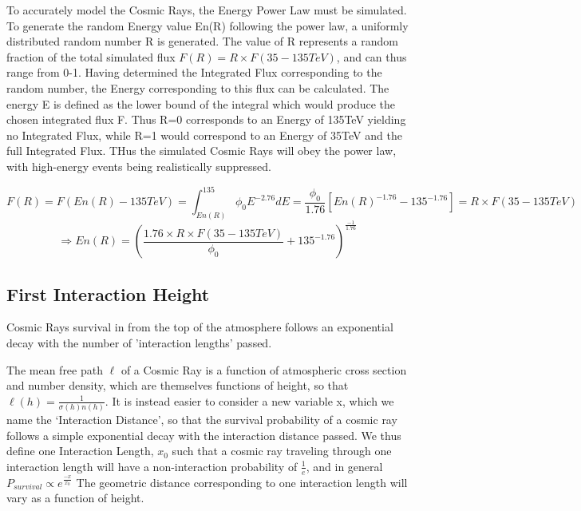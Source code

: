 \documentclass{article}
\begin{document}
To accurately model the Cosmic Rays, the Energy Power Law must be simulated. To generate the random Energy value En(R) following the power law, a uniformly distributed random number R is generated. The value of R represents a random fraction of the total simulated flux $ F(R) = R \times F(35-135TeV) $, and can thus range from 0-1. Having determined the Integrated Flux corresponding to the random number, the Energy corresponding to this flux can be calculated. The energy E is defined as the lower bound of the integral which would produce the chosen integrated flux F. Thus R=0 corresponds to an Energy of 135TeV yielding no Integrated Flux, while R=1 would correspond to an Energy of 35TeV and the full Integrated Flux. THus the simulated Cosmic Rays will obey the power law, with high-energy events being realistically suppressed.

\[ F(R) = F(En(R)-135TeV) = \int_{En(R)}^{135} \phi_{0} E^{-2.76} dE =\frac{\phi_{0}}{1.76}[En(R)^{-1.76} - 135^{-1.76}]= R \times F(35-135TeV)\] \[\Longrightarrow  En(R) = (\frac{1.76\times R \times F(35-135TeV)}{\phi_{0}} +135^{-1.76})^{\frac{-1}{1.76}} \]

\subsection{First Interaction Height}
Cosmic Rays survival in from the top of the atmosphere follows an exponential decay with the number of 'interaction lengths' passed. 

The mean free path $\ell$ of a Cosmic Ray is a function of atmospheric cross section and number density, which are themselves functions of  height, so that $\ell(h) = \frac{1}{\sigma(h) n(h)}$. It is instead easier to consider a new variable x, which we name the \textquoteleft Interaction Distance', so that the survival probability of a cosmic ray follows a simple exponential decay with the interaction distance passed. We thus define one Interaction Length, $x_{0}$ such that a cosmic ray traveling through one interaction length will have a non-interaction probability of $\frac{1}{e}$, and in general $P_{survival} \propto e^{\frac{-x}{x_{0}}}$ The geometric distance corresponding to one interaction length will vary as a function of height.
\end{document}
